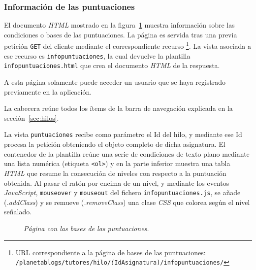\documentclass[a4paper, 12pt]{book}
\begin{document}
\subsubsection{Informaci\'on de las puntuaciones} 
\label{sec:informacionpuntuaciones}
El documento \textit{HTML} mostrado en la figura~\ref{fig:informacionpuntuaciones} muestra informaci\'on sobre las condiciones o bases de las puntuaciones. 
La p\'agina es servida tras una previa petici\'on \texttt{GET} del cliente mediante el correspondiente recurso \footnote{URL correspondiente a la p\'agina de 
bases de las puntuaciones:\\ \texttt{/planetablogs/tutores/hilo/\textit(IdAsignatura)/infopuntuaciones/}}. La vista asociada a ese recurso es 
\texttt{infopuntuaciones}, la cual devuelve la plantilla \texttt{infopuntuaciones.html} que crea el documento \textit{HTML} de la respuesta.

A esta p\'agina solamente puede acceder un usuario que se haya registrado previamente en la aplicaci\'on.

La cabecera re\'une todos los \'items de la barra de navegaci\'on explicada en la secci\'on~\ref{sec:hilos}.

La vista \texttt{puntuaciones} recibe como par\'ametro el Id del hilo, y mediante ese Id procesa la petici\'on obteniendo el objeto completo de dicha 
asignatura. El contenedor de la plantilla re\'une una serie de condiciones de texto plano mediante una lista num\'erica (etiqueta \texttt{<ol>}) y 
en la parte inferior muestra una tabla \textit{HTML} que resume la consecuci\'on de niveles con respecto a la puntuaci\'on obtenida. Al pasar el rat\'on por encima 
de un nivel, y mediante los eventos \textit{JavaScript}, \texttt{mouseover} y \texttt{mouseout} del fichero \texttt{infopuntuaciones.js}, se a\~nade 
(\textit{.addClass}) y se remueve (\textit{.removeClass}) una clase \textit{CSS} que colorea seg\'un el nivel se\~nalado.

\begin{figure}
  \centering
  \caption{\textit{P\'agina con las bases de las puntuaciones.}}
  \label{fig:informacionpuntuaciones}
\end{figure}
\end{document}
